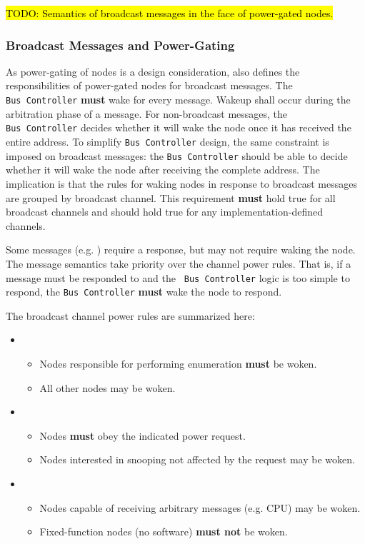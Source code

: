 \hl{TODO: Semantics of broadcast messages in the face of power-gated nodes.}

\subsubsection{Broadcast Messages and Power-Gating}
As power-gating of nodes is a \bus design consideration, \bus also defines the
responsibilities of power-gated nodes for broadcast messages. The {\tt
Bus~Controller} {\bf must} wake for every message. Wakeup shall occur during
the arbitration phase of a message. For non-broadcast messages, the {\tt
Bus~Controller} decides whether it will wake the node once it has received the
entire address. To simplify {\tt Bus~Controller} design, the same constraint
is imposed on broadcast messages: the {\tt Bus~Controller} should be able to
decide whether it will wake the node after receiving the complete address.
The implication is that the rules for waking nodes in response to broadcast
messages are grouped by broadcast channel. This requirement {\bf must} hold
true for all \bus broadcast channels and should hold true for any
implementation-defined channels.

Some messages (e.g. ) require a response, but may
not require waking the node. The message semantics take priority over the
channel power rules. That is, if a message must be responded to and the {\tt
Bus~Controller} logic is too simple to respond, the {\tt Bus~Controller} {\bf
must} wake the node to respond.

The \bus broadcast channel power rules are summarized here:
\begin{itemize}
  \item {}
  \begin{itemize}
    \item Nodes responsible for performing enumeration {\bf must} be woken.
    \item All other nodes may be woken.
  \end{itemize}
  \item {}
  \begin{itemize}
    \item Nodes {\bf must} obey the indicated power request.
    \item Nodes interested in snooping not affected by the request may be woken.
  \end{itemize}
  \item {}
  \begin{itemize}
    \item Nodes capable of receiving arbitrary messages (e.g. CPU) may be
             woken.
    \item Fixed-function nodes (no software) {\bf must not} be woken.
  \end{itemize}
\end{itemize}

